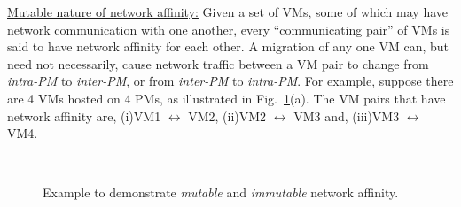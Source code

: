 \underline{Mutable nature of network affinity:} Given a set of VMs, some 
of which may have network communication with one another, every 
``communicating pair'' of VMs is said to have network affinity for each other.
A migration of any one VM can, but need not necessarily, cause
network traffic between a VM pair to change from \textit{intra-PM}
to \textit{inter-PM}, or from \textit{inter-PM} to \textit{intra-PM}.
For example, suppose there are 4 VMs hosted on 4 PMs, as illustrated
in Fig.~\ref{fig:mutable}(a). The VM pairs that have
network affinity are, (i)VM1 $\leftrightarrow$ VM2,
(ii)VM2 $\leftrightarrow$ VM3 and,
(iii)VM3 $\leftrightarrow$ VM4. 

\begin{figure}[h]
\begin{center}
	~~~~~~~~~~~~~~~~~~~~~~~~~~
	\caption{Example to demonstrate \textit{mutable} and \textit{immutable} network affinity.}
\label{fig:mutable}
\end{center}
\end{figure}

